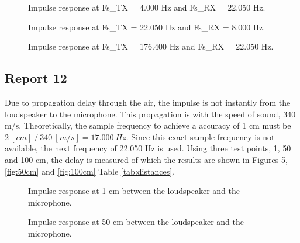 \documentclass[final]{scrreprt} %
\begin{document}
\begin{figure}[H]
	\centering
	\setlength\figureheight{4cm}
    	\setlength{}
	
	\caption{Impulse response at Fs\_TX = 4.000 Hz and Fs\_RX = 22.050 Hz.}
	\label{fig:response_2}
\end{figure}

\begin{figure}[H]
	\centering
	\setlength\figureheight{4cm}
    	\setlength{}
	
	\caption{Impulse response at Fs\_TX = 22.050 Hz and Fs\_RX = 8.000 Hz.}
	\label{fig:response_3}
\end{figure}

\begin{figure}[H]
	\centering
	\setlength\figureheight{4cm}
    	\setlength{}
	
	\caption{Impulse response at Fs\_TX = 176.400 Hz and Fs\_RX = 22.050 Hz.}
	\label{fig:highest_freq}
\end{figure}

\subsection{Report 12}
Due to propagation delay through the air, the impulse is not instantly from the loudspeaker to the microphone.
This propagation is with the speed of sound, 340 m/s.
Theoretically, the sample frequency to achieve a accuracy of 1 cm must be $2 ~[cm] ~/~ 340 ~[m/s] = 17.000 ~ Hz$.
Since this exact sample frequency is not available, the next frequency of 22.050 Hz is used.
Using three test points, 1, 50 and 100 cm, the delay is measured of which the results are shown in Figures \ref{fig:1cm}, \ref{fig:50cm} and \ref{fig:100cm} Table \ref{tab:distances}.

\begin{figure}[H]
	\centering
	\setlength\figureheight{4cm}
    	\setlength{}
	
	\caption{Impulse response at 1 cm between the loudspeaker and the microphone.}
	\label{fig:1cm}
\end{figure}

\begin{figure}[H]
	\centering
	\setlength\figureheight{4cm}
    	\setlength{}
	
	\caption{Impulse response at 50 cm between the loudspeaker and the microphone.}
	\label{fig:1cm}
\end{figure}
\end{document}
